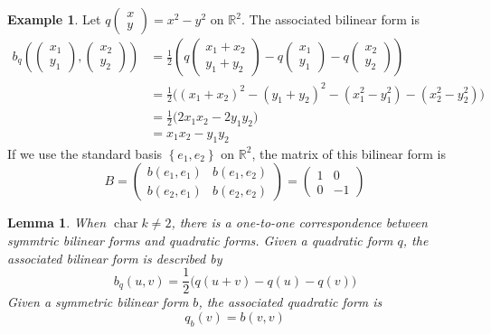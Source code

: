 \documentclass[12pt]{article}
\newtheorem{lemma}[theorem]{Lemma}
\theoremstyle{definition}
\newtheorem{example}[theorem]{Example}
\numberwithin{theorem}{subsection}
\newcommand{\R}{\mathbb{R}}
\newcommand{\lp}{\left(}
\newcommand{\rp}{\right)}
\newcommand{\lb}{\left\{}
\newcommand{\rb}{\right\}}
\DeclareMathOperator{\characteristic}{char}
\begin{document}
\begin{example}
Let $q \begin{pmatrix} x \\ y \end{pmatrix} = x^2 - y^2$ on $\R^2$. The associated bilinear form is
\begin{align*}
	b_q \lp
	\begin{pmatrix}
		x_1 \\
		y_1
	\end{pmatrix}
	,
	\begin{pmatrix}
		x_2 \\
		y_2
	\end{pmatrix}
	\rp &= \frac 12 \lp
	q 
	\begin{pmatrix}
		x_1 + x_2 \\
		y_1 + y_2
	\end{pmatrix}
	-
	q 
	\begin{pmatrix}
		x_1 \\
		y_1
	\end{pmatrix}
	-
	q 
	\begin{pmatrix}
		x_2 \\
		y_2
	\end{pmatrix}
	\rp \\
	&= \frac 12 \Big( (x_1 + x_2)^2 - (y_1 + y_2)^2 - (x_1^2 - y_1^2) - (x_2^2 - y_2^2)  \Big) \\
	&= \frac 12 \Big( 2x_1 x_2  - 2y_1 y_2 \Big) \\
	&= x_1 x_2 - y_1 y_2
\end{align*}
If we use the standard basis $\lb e_1, e_2 \rb$ on $\R^2$, the matrix of this bilinear form is
\[
	B =
	\begin{pmatrix}
		b(e_1, e_1) & b(e_1, e_2) \\
		b(e_2, e_1) & b(e_2, e_2) 
	\end{pmatrix}
	=
	\begin{pmatrix}
		1 & 0 \\
		0 & -1
	\end{pmatrix}
\]
\end{example}

\begin{lemma}
When $\characteristic k \neq 2$, there is a one-to-one correspondence between symmtric bilinear forms and quadratic forms. Given a quadratic form $q$, the associated bilinear form is described by
\[
	b_q(u,v) = \frac 12 \Big( q(u+v) - q(u) - q(v) \Big)
\]
Given a symmetric bilinear form $b$, the associated quadratic form is
\[
	q_b(v) = b(v,v)
\]
\end{lemma}
\end{document}
